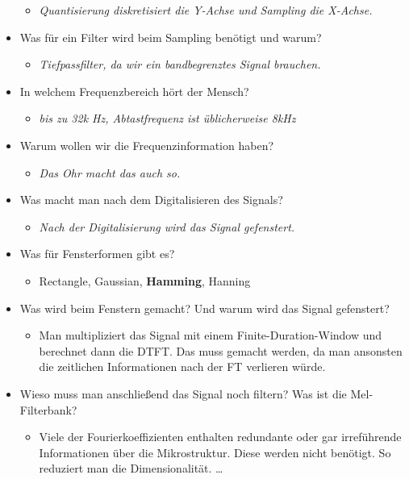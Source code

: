 \begin{itemize}
\begin{itemize}
\item \emph{Quantisierung diskretisiert die Y-Achse und Sampling die X-Achse.}
\end{itemize}
\item Was für ein Filter wird beim Sampling benötigt und warum?
\begin{itemize}
\item \emph{Tiefpassfilter, da wir ein bandbegrenztes Signal brauchen.}
\end{itemize}
\item In welchem Frequenzbereich hört der Mensch?
\begin{itemize}
\item \emph{bis zu 32k Hz, Abtastfrequenz ist üblicherweise 8kHz}
\end{itemize}
\item Warum wollen wir die Frequenzinformation haben?
\begin{itemize}
\item \emph{Das Ohr macht das auch so.}
\end{itemize}
\item Was macht man nach dem Digitalisieren des Signals?
\begin{itemize}
\item \emph{Nach der Digitalisierung wird das Signal gefenstert.}
\end{itemize}
\item Was für Fensterformen gibt es?
\begin{itemize}
\item Rectangle, Gaussian, \textbf{Hamming}, Hanning
\end{itemize}
\item Was wird beim Fenstern gemacht? Und warum wird das Signal gefenstert?
\begin{itemize}
\item Man multipliziert das Signal mit einem Finite-Duration-Window und berechnet dann die DTFT. Das muss gemacht werden, da man ansonsten die zeitlichen Informationen nach der FT verlieren würde.
\end{itemize}
\item Wieso muss man anschließend das Signal noch filtern? Was ist die Mel-Filterbank? 
\begin{itemize}
\item Viele der Fourierkoeffizienten enthalten redundante oder gar irreführende Informationen über die Mikrostruktur. Diese werden nicht benötigt. So reduziert man die Dimensionalität. \dots

\end{itemize}
\end{itemize}
